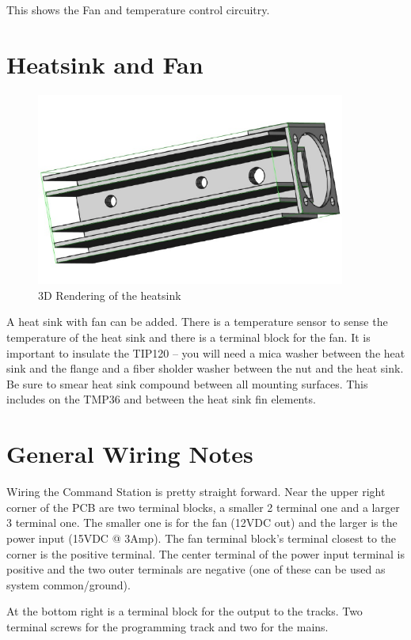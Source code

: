 This shows the Fan and temperature control circuitry.
\clearpage
\section{Heatsink and Fan}
\begin{figure}[hbpt]\begin{centering}%
\includegraphics[width=4in]{HeatSink3D.png}
\caption{3D Rendering of the heatsink}
\end{centering}\end{figure}

A heat sink with fan can be added. There is a temperature sensor to sense the
temperature of the heat sink and there is a terminal block for the fan. It is
important to insulate the TIP120 -- you will need a mica washer between the
heat sink and the flange and a fiber sholder washer between the nut and the
heat sink. Be sure to smear heat sink compound between all mounting surfaces.
This includes on the TMP36 and between the heat sink fin elements.

\section{General Wiring Notes}

Wiring the Command Station is pretty straight forward. Near the upper right
corner of the PCB are two terminal blocks, a smaller 2 terminal one and a
larger 3 terminal one. The smaller one is for the fan (12VDC out) and the
larger is the power input (15VDC @ 3Amp).  The fan terminal block's terminal 
closest to the corner is the positive terminal.  The center terminal of the 
power input terminal is positive and the two outer terminals are negative (one 
of these can be used as system common/ground).

At the bottom right is a terminal block for the output to the tracks.  Two 
terminal screws for the programming track and two for the mains.


